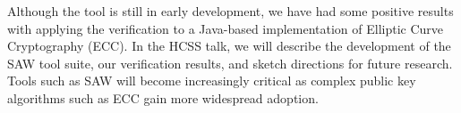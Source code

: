 \documentclass[12pt]{article}
\begin{document}
Although the tool is still in early development, we have had some positive
results with applying the verification to a Java-based implementation of
Elliptic Curve Cryptography (ECC).  In the HCSS talk, we will describe the
development of the SAW tool suite, our verification results, and sketch
directions for future research.  Tools such as SAW will become increasingly
critical as complex public key algorithms such as ECC gain more widespread
adoption.
\end{document}
